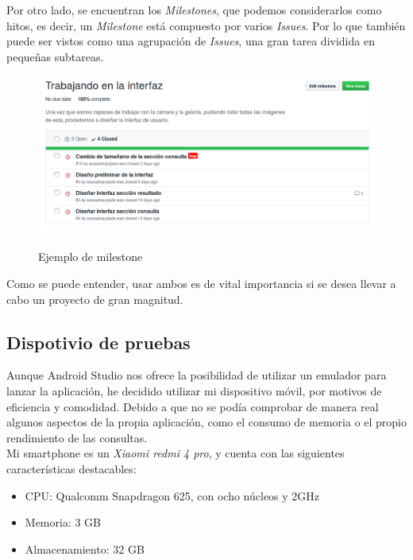 Por otro lado, se encuentran los \textit{Milestones}, que podemos considerarlos como hitos, es decir, un \textit{Milestone} está compuesto por varios \textit{Issues}. Por lo que también puede ser vistos como una agrupación de \textit{Issues}, una gran tarea dividida en pequeñas subtareas.\\

\begin{figure}[H] %
\centering
\includegraphics[scale=0.4]{imagenes/milestone.png}  %
\label{milestone.png}
\caption{Ejemplo de milestone}
\end{figure}

Como se puede entender, usar ambos es de vital importancia si se desea llevar a cabo un proyecto de gran magnitud.

\subsection{Dispotivio de pruebas}

Aunque Android Studio nos ofrece la posibilidad de utilizar un emulador para lanzar la aplicación, he decidido utilizar mi dispositivo móvil, por motivos de eficiencia y comodidad. Debido a que no se podía comprobar de manera real algunos aspectos de la propia aplicación, como el consumo de memoria o el propio rendimiento de las consultas.\\

Mi smartphone es un \textit{Xiaomi redmi 4 pro}, y cuenta con las siguientes características destacables:

\begin{itemize}
\item CPU: Qualcomm Snapdragon 625, con ocho núcleos y 2GHz 
\item Memoria: 3 GB
\item Almacenamiento: 32 GB
\end{itemize}


